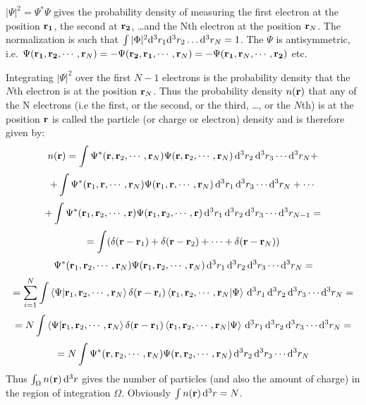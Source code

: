 $|\Psi|^2=\Psi^*\Psi$ gives the probability density of measuring the first electron at the position $\bf r_1$, the second at $\bf r_2$, \dots and the Nth electron at the position ${\bf r}_N$. The normalization is such that $\int |\Phi|^2{\rm d}^3 r_1{\rm d}^3 r_2\dots{\rm d}^3 r_N=1$. The $\Psi$ is antisymmetric, i.e. $\Psi({\bf r_1},{\bf r_2},\cdots,{\bf r}_N)= -\Psi({\bf r_2},{\bf r_1},\cdots,{\bf r}_N)= -\Psi({\bf r_1},{\bf r}_N,\cdots,{\bf r_2})$ etc.

Integrating $|\Psi|^2$ over the first $N-1$ electrons is the probability density that the $N$th electron is at the position ${\bf r}_N$. Thus the probability density $n({\bf r})$ that any of the N electrons (i.e the first, or the second, or the third, \dots, or the $N$th) is at the position $\bf r$ is called the particle (or charge or electron) density and is therefore given by: 
\begin{equation*}
  n({\bf r})= \int \Psi^*({\bf r},{\bf r}_2,\cdots,{\bf r}_N) \Psi ({\bf r},{\bf r}_2,\cdots,{\bf r}_N) \,{\rm d}^3 r_2\,{\rm d}^3 r_3\cdots{\rm d}^3 r_N+
\end{equation*}
\begin{equation*}
  +\int \Psi^*({\bf r}_1,{\bf r},\cdots,{\bf r}_N) \Psi ({\bf r}_1,{\bf r},\cdots,{\bf r}_N) \,{\rm d}^3 r_1\,{\rm d}^3 r_3\cdots{\rm d}^3 r_N+\cdots
\end{equation*}
\begin{equation*}
  +\int \Psi^*({\bf r}_1,{\bf r}_2,\cdots,{\bf r}) \Psi ({\bf r}_1,{\bf r}_2,\cdots,{\bf r}) \,{\rm d}^3 r_1\,{\rm d}^3 r_2\,{\rm d}^3 r_3\cdots{\rm d}^3 r_{N-1}=
\end{equation*}
\begin{equation*}
  =\int(\delta({\bf r}-{\bf r}_1)+\delta({\bf r}-{\bf r}_2)+\cdots+\delta({\bf r}-{\bf r}_N))
\end{equation*}
\begin{equation*}
  \Psi^*({\bf r}_1,{\bf r}_2,\cdots,{\bf r}_N) \Psi ({\bf r}_1,{\bf r}_2,\cdots,{\bf r}_N) \,{\rm d}^3 r_1\,{\rm d}^3 r_2\,{\rm d}^3 r_3\cdots{\rm d}^3 r_{N}=
\end{equation*}
\begin{equation*}
  =\sum_{i=1}^N\int \mathinner{\langle{\Psi|{\bf r}_1,{\bf r}_2,\cdots,{\bf r}_N}\rangle}\delta({\bf r}-{\bf r}_i) \mathinner{\langle{{\bf r}_1,{\bf r}_2,\cdots,{\bf r}_N|\Psi}\rangle} \,{\rm d}^3 r_1\,{\rm d}^3 r_2\,{\rm d}^3 r_3\cdots{\rm d}^3 r_{N}=
\end{equation*}
\begin{equation*}
  =N\int \mathinner{\langle{\Psi|{\bf r}_1,{\bf r}_2,\cdots,{\bf r}_N}\rangle}\delta({\bf r}-{\bf r}_1) \mathinner{\langle{{\bf r}_1,{\bf r}_2,\cdots,{\bf r}_N|\Psi}\rangle} \,{\rm d}^3 r_1\,{\rm d}^3 r_2\,{\rm d}^3 r_3\cdots{\rm d}^3 r_{N}=
\end{equation*}
\begin{equation}
  =N\int \Psi^*({\bf r},{\bf r}_2,\cdots,{\bf r}_N) \Psi ({\bf r},{\bf r}_2,\cdots,{\bf r}_N) \,{\rm d}^3 r_2\,{\rm d}^3 r_3\cdots{\rm d}^3 r_N  \label{chargedensity}
\end{equation}
Thus $\int_\Omega n({\bf r})\,{\rm d}^3r$ gives the number of particles (and also the amount of charge) in the region of integration $\Omega$. Obviously $\int n({\bf r})\,{\rm d}^3r=N$.

